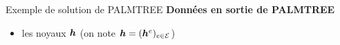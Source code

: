 \begin{frame}{Exemple de solution de PALMTREE}
\textbf{Données en sortie de PALMTREE} 
\begin{itemize}
	\item les noyaux $\bm{h}$ (on note $\bm{h} = (\bm{h}^e)_{e \in \mathcal E}$)
\end{itemize}
\begin{figure}\centering
{}
\end{figure}
\end{frame}


